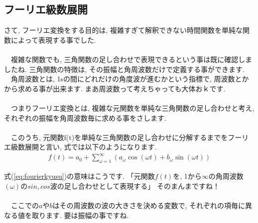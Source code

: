 \documentclass[11pt,a4paper]{ujreport} 	%
\begin{document}
\subsection{フーリエ級数展開}
さて, フーリエ変換をする目的は, 複雑すぎて解釈できない時間関数を単純な関数によって表現する事でした.\\
\\
　複雑な関数でも, 三角関数の足し合わせで表現できるという事は既に確認しましたね. 三角関数の特徴は, その振幅と角周波数だけで定義する事ができます. \\
　角周波数とは, 1sの間にどれだけの角度波が進むかという指標で, 周波数とかから求める事が出来ます. まあ周波数って考えちゃっても大体おｋです. \\
\\
　つまりフーリエ変換とは, 複雑な元関数を単純な三角関数の足し合わせと考え, それぞれの振幅を角周波数毎に求める事をさします.\\
\\
　このうち, 元関数f(t)を単純な三角関数の足し合わせに分解するまでをフーリエ級数展開と言い, 式では以下のようになります. 
\begin{eqnarray}
f(t) = a_0 + \sum_{\omega=1}^\infty {(a_\omega \cos(\omega t) + b_\omega \sin(\omega t))}
\label{eq:fourierkyusu}
\end{eqnarray}

式(\ref{eq:fourierkyusu})の意味はこうです. 「元関数$f(t)$を, 1から$\infty$の角周波数$(\omega)$の$sin, cos$波の足し合わせとして表現する」 そのまんまですね！\\
\\
　ここでの$a$や$b$はその周波数の波の大きさを決める変数で, それぞれの項毎に異なる値を取ります. 要は振幅の事ですね.\\
\end{document}
